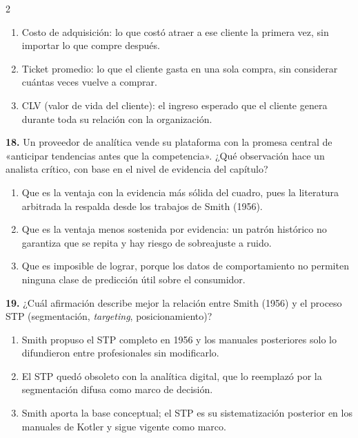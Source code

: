 \documentclass[10pt,letterpaper]{article}
\begin{document}
\begin{multicols}{2}
\vspace{-3pt}
\begin{enumerate}[label=\alph*),leftmargin=1.1em,itemsep=0pt,topsep=1pt,parsep=0pt,partopsep=0pt]
\item Costo de adquisición: lo que costó atraer a ese cliente la primera vez, sin importar lo que compre después.
\item Ticket promedio: lo que el cliente gasta en una sola compra, sin considerar cuántas veces vuelve a comprar.
\item CLV (valor de vida del cliente): el ingreso esperado que el cliente genera durante toda su relación con la organización.
\end{enumerate}
\vspace{2pt}
\noindent\textbf{18.} Un proveedor de analítica vende su plataforma con la promesa central de «anticipar tendencias antes que la competencia». ¿Qué observación hace un analista crítico, con base en el nivel de evidencia del capítulo?
\vspace{-3pt}
\begin{enumerate}[label=\alph*),leftmargin=1.1em,itemsep=0pt,topsep=1pt,parsep=0pt,partopsep=0pt]
\item Que es la ventaja con la evidencia más sólida del cuadro, pues la literatura arbitrada la respalda desde los trabajos de Smith (1956).
\item Que es la ventaja menos sostenida por evidencia: un patrón histórico no garantiza que se repita y hay riesgo de sobreajuste a ruido.
\item Que es imposible de lograr, porque los datos de comportamiento no permiten ninguna clase de predicción útil sobre el consumidor.
\end{enumerate}
\vspace{2pt}
\noindent\textbf{19.} ¿Cuál afirmación describe mejor la relación entre Smith (1956) y el proceso STP (segmentación, \textit{targeting}, posicionamiento)?
\vspace{-3pt}
\begin{enumerate}[label=\alph*),leftmargin=1.1em,itemsep=0pt,topsep=1pt,parsep=0pt,partopsep=0pt]
\item Smith propuso el STP completo en 1956 y los manuales posteriores solo lo difundieron entre profesionales sin modificarlo.
\item El STP quedó obsoleto con la analítica digital, que lo reemplazó por la segmentación difusa como marco de decisión.
\item Smith aporta la base conceptual; el STP es su sistematización posterior en los manuales de Kotler y sigue vigente como marco.

\end{enumerate}
\end{multicols}
\end{document}
